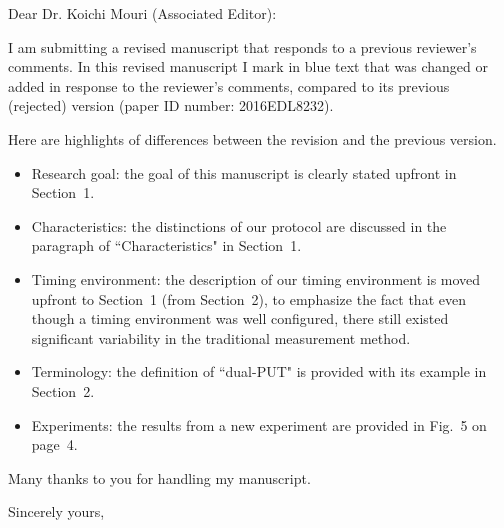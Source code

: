 \documentclass{letter} %
\begin{document}
\begin{letter}
\vspace{0.5in}
 
\opening{Dear Dr. Koichi Mouri (Associated Editor):} 
 
\noindent 

I am submitting a revised manuscript that responds to a previous reviewer's comments. 
In this revised manuscript I mark in blue text that was changed or added in response to the reviewer's comments, 
compared to its previous (rejected) version (paper ID number: 2016EDL8232).

Here are highlights of differences between the revision and the previous version.

\begin{itemize}

\item Research goal: the goal of this manuscript is clearly stated upfront in Section~1. 

\item Characteristics: the distinctions of our protocol are discussed 
in the paragraph of ``Characteristics" in Section~1. 

\item Timing environment: the description of our timing environment 
is moved upfront to Section~1 (from Section~2), 
to emphasize the fact that even though a timing environment was well configured, 
there still existed significant variability in the traditional measurement method.

\item Terminology: the definition of ``dual-PUT" is provided with its example in Section~2. 

\item Experiments: the results from a new experiment are provided in Fig.~5 on page~4.

\end{itemize} 

Many thanks to you for handling my manuscript.

\closing{Sincerely yours,} 

\end{letter}
 
\end{document}
